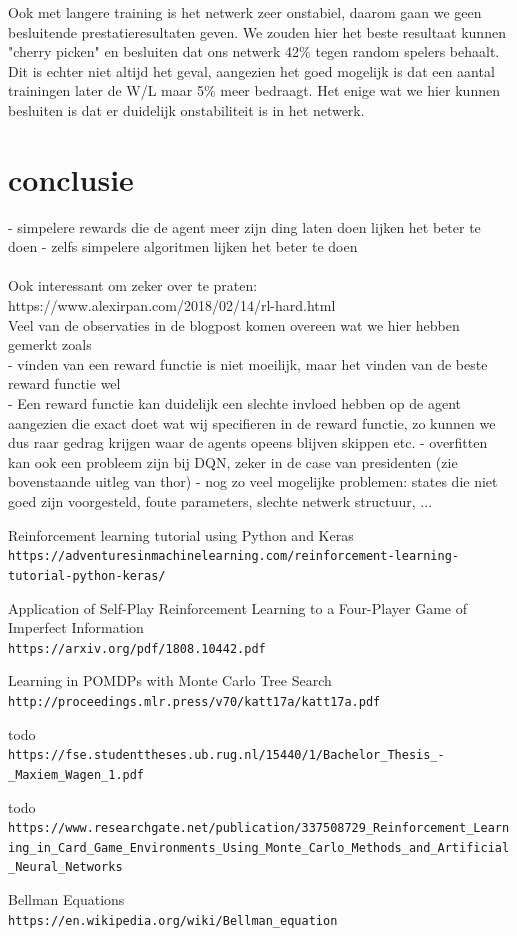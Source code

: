\documentclass[11pt]{article}
\begin{document}
\noindent Ook met langere training is het netwerk zeer onstabiel, daarom gaan we geen besluitende prestatieresultaten geven. We zouden hier het beste resultaat kunnen "cherry picken" en besluiten dat ons netwerk 42\% tegen random spelers behaalt. Dit is echter niet altijd het geval, aangezien het goed mogelijk is dat een aantal trainingen later de W/L maar 5\% meer bedraagt. Het enige wat we hier kunnen besluiten is dat er duidelijk onstabiliteit is in het netwerk.
\section{conclusie}
- simpelere rewards die de agent meer zijn ding laten doen lijken het beter te doen
- zelfs simpelere algoritmen lijken het beter te doen\\\\

Ook interessant om zeker over te praten:\\
https://www.alexirpan.com/2018/02/14/rl-hard.html\\
Veel van de observaties in de blogpost komen overeen wat we hier hebben gemerkt zoals\\
- vinden van een reward functie is niet moeilijk, maar het vinden van de beste reward functie wel\\
- Een reward functie kan duidelijk een slechte invloed hebben op de agent aangezien die exact doet wat wij specifieren in de reward functie, zo kunnen we dus raar gedrag krijgen waar de agents opeens blijven skippen etc.
- overfitten kan ook een probleem zijn bij DQN, zeker in de case van presidenten (zie bovenstaande uitleg van thor)
- nog zo veel mogelijke problemen: states die niet goed zijn voorgesteld, foute parameters, slechte netwerk structuur, ...

\newpage
\begin{thebibliography}{9}
Reinforcement learning tutorial using Python and Keras 
\\\texttt{https://adventuresinmachinelearning.com/reinforcement-learning-tutorial-python-keras/}

Application of Self-Play Reinforcement Learning to a Four-Player Game of Imperfect Information
\\\texttt{https://arxiv.org/pdf/1808.10442.pdf}

Learning in POMDPs with Monte Carlo Tree Search
\\\texttt{http://proceedings.mlr.press/v70/katt17a/katt17a.pdf}

todo
\\\texttt{https://fse.studenttheses.ub.rug.nl/15440/1/Bachelor\_Thesis\_-\_Maxiem\_Wagen\_1.pdf}

todo
\\\texttt{https://www.researchgate.net/publication/337508729\_Reinforcement\_Learning\_in\_Card\_Game\_Environments\_Using\_Monte\_Carlo\_Methods\_and\_Artificial\_Neural\_Networks}

Bellman Equations
\\\texttt{https://en.wikipedia.org/wiki/Bellman\_equation}
\end{thebibliography}
\newpage
\end{document}
